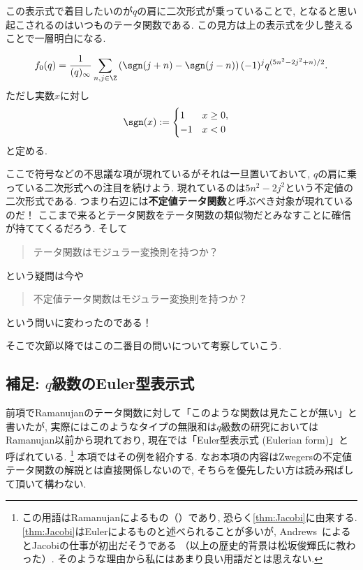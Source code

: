 \documentclass[11pt,b5paper,oneside,lualatex]{ltjsarticle} %
\numberwithin{equation}{section} %
\begin{document}
この表示式で着目したいのが$ q $の肩に二次形式が乗っていることで, となると思い起こされるのはいつものテータ関数である. 
この見方は上の表示式を少し整えることで一層明白になる. 

\begin{cor} \label{cor:mock_indefinite}
	\[
	f_0 (q) = \frac{1}{(q)_\infty}
	\sum_{n, j \in \Z} \left( \sgn(j+n) - \sgn(j-n) \right) (-1)^j q^{(5n^2 - 2j^2 + n)/2}.
	\]	
	ただし実数$ x $に対し
	\begin{align}
		\sgn(x) &:= 
		\begin{cases}
			1 & x \ge 0, \\
			-1 & x < 0
		\end{cases}
	\end{align}
	と定める. 
\end{cor}

ここで符号などの不思議な項が現れているがそれは一旦置いておいて, $ q $の肩に乗っている二次形式への注目を続けよう. 
現れているのは$ 5n^2 - 2j^2 $という不定値の二次形式である. 
つまり右辺には\textbf{不定値テータ関数}と呼ぶべき対象が現れているのだ！
ここまで来るとテータ関数をテータ関数の類似物だとみなすことに確信が持ててくるだろう. 
そして
\begin{quote}
	\centering
	テータ関数はモジュラー変換則を持つか？
\end{quote}
という疑問は今や
\begin{quote}
	\centering
	不定値テータ関数はモジュラー変換則を持つか？
\end{quote}
という問いに変わったのである！

そこで次節以降ではこの二番目の問いについて考察していこう. 


\subsection{補足: $ q $級数のEuler型表示式} \label{subsec:Eulerian_form}


前項でRamanujanのテータ関数に対して「このような関数は見たことが無い」と書いたが, 実際にはこのようなタイプの無限和は$ q $級数の研究においてはRamanujan以前から現れており, 現在では「Euler型表示式 (Eulerian form)」と呼ばれている. 
\footnote{この用語はRamanujanによるもの（\cite[119ページ]{魅惑}）であり, 恐らく\cref{thm:Jacobi}に由来する. 
	\cref{thm:Jacobi}はEulerによるものと述べられることが多いが, Andrews~\cite{Andrews_combi}によるとJacobiの仕事が初出だそうである
	（以上の歴史的背景は松坂俊輝氏に教わった）. 
	そのような理由から私にはあまり良い用語だとは思えない. }
本項ではその例を紹介する. 
なお本項の内容はZwegersの不定値テータ関数の解説とは直接関係しないので, そちらを優先したい方は読み飛ばして頂いて構わない. 
\end{document}
